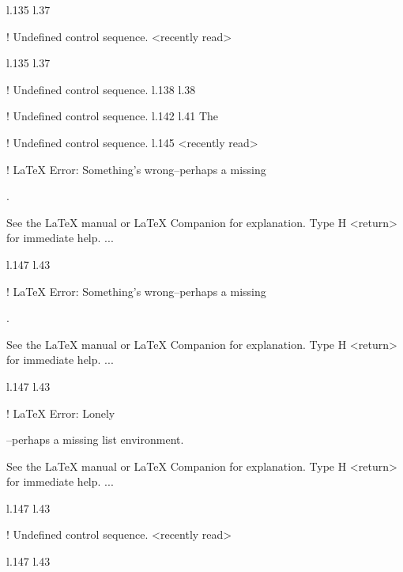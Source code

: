 {{{{{{{{{{{{l.135 l.37     \item \xmlNode
                             
! Undefined control sequence.
<recently read> \xmlNode 
                         
l.135 l.37     \item \xmlNode
                             
! Undefined control sequence.
l.138 l.38       \xmlNode
                         
! Undefined control sequence.
l.142 l.41       The \xmlNode
                             
! Undefined control sequence.
l.145 <recently read> \xmlNode
                              

! LaTeX Error: Something's wrong--perhaps a missing \item.

See the LaTeX manual or LaTeX Companion for explanation.
Type  H <return>  for immediate help.
 ...                                              
                                                  
l.147 l.43         \item \xmlNode
                                 

! LaTeX Error: Something's wrong--perhaps a missing \item.

See the LaTeX manual or LaTeX Companion for explanation.
Type  H <return>  for immediate help.
 ...                                              
                                                  
l.147 l.43         \item \xmlNode
                                 

! LaTeX Error: Lonely \item--perhaps a missing list environment.

See the LaTeX manual or LaTeX Companion for explanation.
Type  H <return>  for immediate help.
 ...                                              
                                                  
l.147 l.43         \item \xmlNode
                                 
! Undefined control sequence.
<recently read> \xmlNode 
                         
l.147 l.43         \item \xmlNode
                                 
}}}}}}}}}}}}
